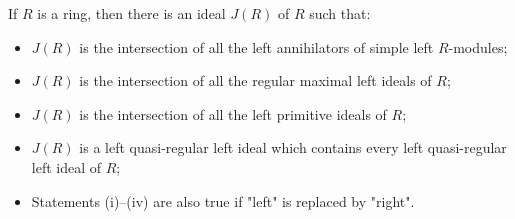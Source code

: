 If $R$ is a ring, then there is an ideal $J(R)$ of $R$ such that:
\begin{itemize}
\item[(i)] $J(R)$ is the intersection of all the left annihilators of simple left $R$-modules;
\item[(ii)] $J(R)$ is the intersection of all the regular maximal left ideals of $R$;
\item[(iii)] $J(R)$ is the intersection of all the left primitive ideals of $R$;
\item[(iv)] $J(R)$ is a left quasi-regular left ideal which contains every left quasi-regular left ideal of $R$;
\item[(v)] Statements (i)--(iv) are also true if "left" is replaced by "right".
\end{itemize}
